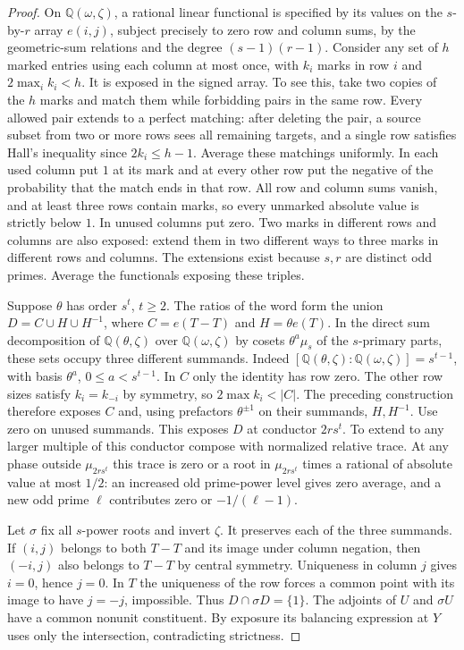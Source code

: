 \documentclass[11pt,a4paper]{article}
\numberwithin{equation}{section}
\theoremstyle{remark}
\begin{document}
\begin{proof}
On $\mathbb Q(\omega,\zeta)$, a rational linear functional is specified
by its values on the $s$-by-$r$ array $e(i,j)$, subject precisely to zero
row and column sums, by the geometric-sum relations and the degree
$(s-1)(r-1)$.
Consider any set of $h$ marked entries using each column at most once,
with $k_i$ marks in row $i$ and $2\max_i k_i<h$. It is exposed in the
signed array. To see this, take two copies of the $h$ marks and match
them while forbidding pairs in the same row. Every allowed pair extends
to a perfect matching: after deleting the pair, a source subset from
two or more rows sees all remaining targets, and a single row satisfies
Hall's inequality since $2k_i\le h-1$. Average these matchings uniformly.
In each used column put $1$ at its mark and at every other row put the
negative of the probability that the match ends in that row. All row
and column sums vanish, and at least three rows contain marks, so every
unmarked absolute value is strictly below $1$. In unused columns put zero.
Two marks in different rows and columns are also exposed: extend them
in two different ways to three marks in different rows and columns.
The extensions exist because $s,r$ are distinct odd primes. Average the
functionals exposing these triples.

Suppose $\theta$ has order $s^t$, $t\ge2$. The ratios of the word form
the union $D=C\cup H\cup H^{-1}$, where $C=e(T-T)$ and $H=\theta e(T)$.
In the direct sum decomposition of $\mathbb Q(\theta,\zeta)$ over
$\mathbb Q(\omega,\zeta)$ by cosets $\theta^a\mu_s$ of the $s$-primary
parts, these sets occupy three different summands. Indeed
$[\mathbb Q(\theta,\zeta):\mathbb Q(\omega,\zeta)]=s^{t-1}$,
with basis $\theta^a$, $0\le a<s^{t-1}$.
In $C$ only the identity has row zero. The other row sizes satisfy
$k_i=k_{-i}$ by symmetry, so $2\max k_i<|C|$.
The preceding construction therefore exposes $C$ and, using prefactors
$\theta^{\pm1}$ on their summands, $H,H^{-1}$.
Use zero on unused summands. This exposes $D$ at conductor $2rs^t$.
To extend to any larger multiple of this conductor compose with
normalized relative trace. At any phase outside $\mu_{2rs^t}$ this trace
is zero or a root in $\mu_{2rs^t}$ times a rational of absolute value
at most $1/2$: an increased old prime-power level gives zero average,
and a new odd prime $\ell$ contributes zero or $-1/(\ell-1)$.

Let $\sigma$ fix all $s$-power roots and invert $\zeta$. It preserves
each of the three summands. If $(i,j)$ belongs to both $T-T$ and its
image under column negation, then $(-i,j)$ also belongs to $T-T$ by
central symmetry. Uniqueness in column $j$ gives $i=0$, hence $j=0$.
In $T$ the uniqueness of the row forces a common point with its image to
have $j=-j$, impossible. Thus $D\cap\sigma D=\{1\}$.
The adjoints of $U$ and $\sigma U$ have a common nonunit constituent.
By exposure its balancing expression at $Y$ uses only the intersection,
contradicting strictness.
\end{proof}
\end{document}
